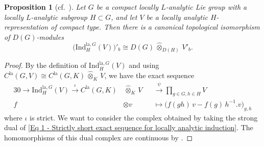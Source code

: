 \documentclass[a4paper, reqno, 10pt]{amsart}
\newtheorem{proposition}[theorem]{Proposition}
\theoremstyle{definition}
\numberwithin{equation}{section}
\newcommand{\cotimes}[1]{{\,\widehat{\otimes}_{#1}\,}}
\newcommand{\Ind}{{\mathrm{Ind}}}
\newcommand{\la}{{\mathrm{la}}}
\newcommand{\lra}{\longrightarrow}
\newcommand{\lto}{\longmapsto}
\begin{document}
\begin{proposition}[{cf.\ \cite[\S 5]{Kohlhaase11CohomLocAnRep}}]
	Let $G$ be a compact locally $L$-analytic Lie group with a locally $L$-analytic subgroup $H\subset G$, and let $V$ be a locally analytic $H$-representation of compact type.
	Then there is a canonical topological isomorphism of $D(G)$-modules
	\begin{equation*}
		\big( \Ind_H^{\la,G} (V) \big)'_b\cong D(G) \cotimes{D(H)} V'_b  .
	\end{equation*}
\end{proposition}
\begin{proof}
	By the definition of $\Ind^{\la, G}_H (V)$ and using $C^\la(G,V) \cong C^\la(G,K) \cotimes{K} V$, we have the exact sequence
	\begin{alignat}{3}\label{Eq 1 - Strictly short exact sequence for locally analytic induction}
		0 \lra \Ind^{\la,G}_H(V) \overset{\iota}{\lra} C^\la(G,K) &\,\widehat{\otimes}_K\, V &&\overset{\psi}{\lra} \prod_{g \in G, h\in H} V  \\
		f &\otimes v &&\lto \big( f(gh) \, v - f(g)\, h^{-1}.v \big)_{g, h}  \nonumber
	\end{alignat}
	where $\iota$ is strict.
	We want to consider the complex obtained by taking the strong dual of \eqref{Eq 1 - Strictly short exact sequence for locally analytic induction}.
	The homomorphisms of this dual complex are continuous by \cite[Rmk.\ 16.1]{Schneider02NonArchFunctAna}.
	

\end{proof}
\end{document}

